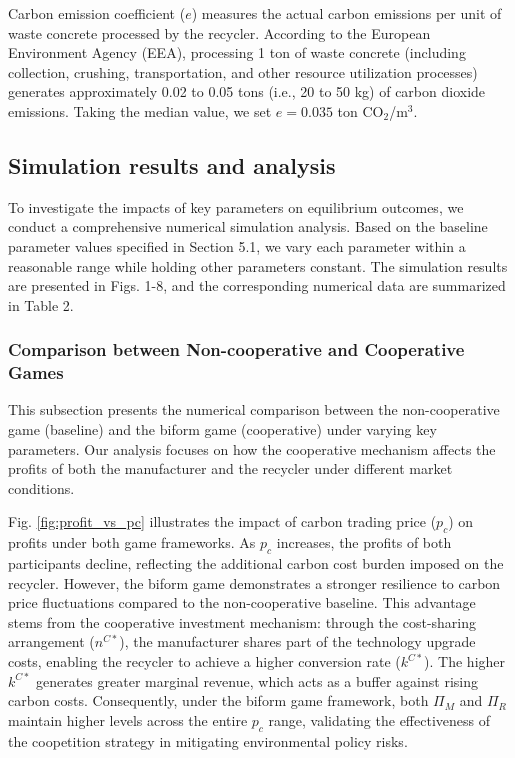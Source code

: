 \documentclass[authoryear,preprint,review,times,10pt]{elsarticle}
\begin{document}
Carbon emission coefficient ($e$) measures the actual carbon emissions per unit of waste concrete processed by the recycler. According to the European Environment Agency (EEA), processing 1 ton of waste concrete (including collection, crushing, transportation, and other resource utilization processes) generates approximately 0.02 to 0.05 tons (i.e., 20 to 50 kg) of carbon dioxide emissions. Taking the median value, we set $e = 0.035$ ton CO$_2$/m$^3$.


\subsection{Simulation results and analysis}
\label{sec:simulation_analysis}

To investigate the impacts of key parameters on equilibrium outcomes, we conduct a comprehensive numerical simulation analysis. Based on the baseline parameter values specified in Section 5.1, we vary each parameter within a reasonable range while holding other parameters constant. The simulation results are presented in Figs. 1-8, and the corresponding numerical data are summarized in Table 2.

\subsubsection{Comparison between Non-cooperative and Cooperative Games}
\label{sec:comparison}

This subsection presents the numerical comparison between the non-cooperative game (baseline) and the biform game (cooperative) under varying key parameters. Our analysis focuses on how the cooperative mechanism affects the profits of both the manufacturer and the recycler under different market conditions.

Fig. \ref{fig:profit_vs_pc} illustrates the impact of carbon trading price ($p_c$) on profits under both game frameworks. As $p_c$ increases, the profits of both participants decline, reflecting the additional carbon cost burden imposed on the recycler. However, the biform game demonstrates a stronger resilience to carbon price fluctuations compared to the non-cooperative baseline. This advantage stems from the cooperative investment mechanism: through the cost-sharing arrangement ($n^{C*}$), the manufacturer shares part of the technology upgrade costs, enabling the recycler to achieve a higher conversion rate ($k^{C*}$). The higher $k^{C*}$ generates greater marginal revenue, which acts as a buffer against rising carbon costs. Consequently, under the biform game framework, both $\Pi_M$ and $\Pi_R$ maintain higher levels across the entire $p_c$ range, validating the effectiveness of the coopetition strategy in mitigating environmental policy risks.
\end{document}
